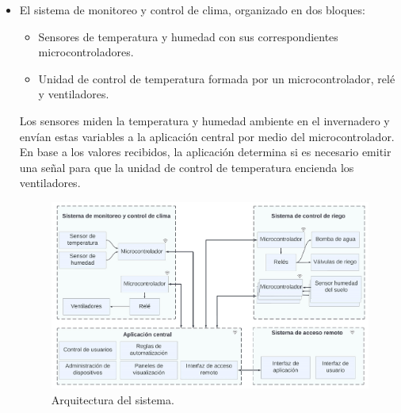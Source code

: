 \begin{itemize}
\item El sistema de monitoreo y control de clima, organizado en dos bloques:
\begin{itemize}
\item Sensores de temperatura y humedad con sus correspondientes microcontroladores.
\item Unidad de control de temperatura formada por un microcontrolador, relé y ventiladores. 
\end{itemize}
Los sensores miden la temperatura y humedad ambiente en el invernadero y envían estas variables a la aplicación central por medio del microcontrolador. En base a los valores recibidos, la aplicación determina si es necesario emitir una señal para que la unidad de control de temperatura encienda los ventiladores.


\begin{figure}[h]
	\centering
	\includegraphics[width=1.0\textwidth]{./Figures/blockdiagram4.jpg}
	\caption[Arquitectura del sistema.]{Arquitectura del sistema.}
	\label{fig:blockdiagram}

\end{figure}
%



\end{itemize}
